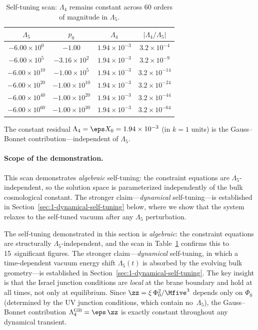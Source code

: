 \begin{table}[h]
\centering
\caption{Self-tuning scan: $\Lambda_4$ remains constant across 60 orders of magnitude in $\Lambda_5$.}
\label{tab:1-self-tuning}
\begin{tabular}{@{}cccc@{}}
\toprule
$\Lambda_5$ & $p_0$ & $\Lambda_4$ & $|\Lambda_4/\Lambda_5|$ \\
\midrule
$-6.00 \times 10^{0}$ & $-1.00$ & $1.94 \times 10^{-3}$ & $3.2 \times 10^{-4}$ \\
$-6.00 \times 10^{5}$ & $-3.16 \times 10^{2}$ & $1.94 \times 10^{-3}$ & $3.2 \times 10^{-9}$ \\
$-6.00 \times 10^{10}$ & $-1.00 \times 10^{5}$ & $1.94 \times 10^{-3}$ & $3.2 \times 10^{-14}$ \\
$-6.00 \times 10^{20}$ & $-1.00 \times 10^{10}$ & $1.94 \times 10^{-3}$ & $3.2 \times 10^{-24}$ \\
$-6.00 \times 10^{40}$ & $-1.00 \times 10^{20}$ & $1.94 \times 10^{-3}$ & $3.2 \times 10^{-44}$ \\
$-6.00 \times 10^{60}$ & $-1.00 \times 10^{30}$ & $1.94 \times 10^{-3}$ & $3.2 \times 10^{-64}$ \\
\bottomrule
\end{tabular}
\end{table}

\noindent The constant residual $\Lambda_4 = \eps X_0 = 1.94 \times 10^{-3}$ (in $k = 1$ units) is the Gauss--Bonnet contribution---independent of $\Lambda_5$.

\paragraph{Scope of the demonstration.} This scan demonstrates \emph{algebraic} self-tuning: the constraint equations are $\Lambda_5$-independent, so the solution space is parameterized independently of the bulk cosmological constant. The stronger claim---\emph{dynamical} self-tuning---is established in Section~\ref{sec:1-dynamical-self-tuning} below, where we show that the system relaxes to the self-tuned vacuum after any $\Lambda_5$ perturbation.

\begin{remark}
\label{rem:1-algebraic-self-tuning}
The self-tuning demonstrated in this section is \emph{algebraic}: the constraint equations are structurally $\Lambda_5$-independent, and the scan in Table~\ref{tab:1-self-tuning} confirms this to 15~significant figures. The stronger claim---\emph{dynamical} self-tuning, in which a time-dependent vacuum energy shift $\Lambda_5(t)$ is absorbed by the evolving bulk geometry---is established in Section~\ref{sec:1-dynamical-self-tuning}. The key insight is that the Israel junction conditions are \emph{local} at the brane boundary and hold at all times, not only at equilibrium. Since $\zz = \xi\,\Phi_0^2/\Mfive^3$ depends only on $\Phi_0$ (determined by the UV junction conditions, which contain no~$\Lambda_5$), the Gauss--Bonnet contribution $\Lambda_4^{\mathrm{GB}} = \eps\,\zz$ is exactly constant throughout any dynamical transient.
\end{remark}

